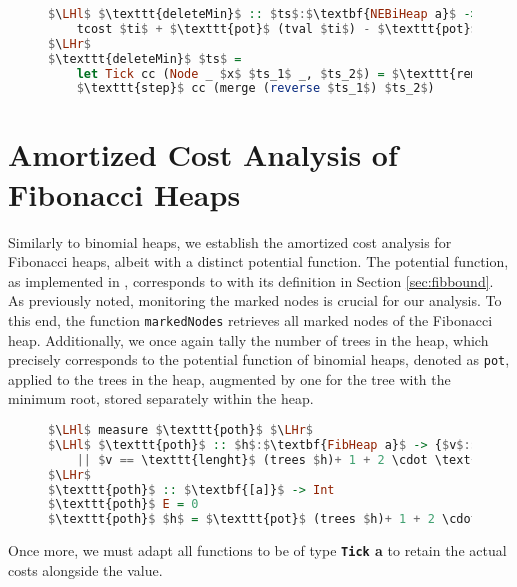 \documentclass{clmthesis}
\begin{document}
\begin{figure}[h]
\begin{lstlisting}[mathescape=true, language=haskell, caption={Amortized cost analysis of \texttt{deleteMin}.},captionpos=b, label=fig:deleteMinPot]
$\LHl$ $\texttt{deleteMin}$ :: $ts$:$\textbf{NEBiHeap a}$ -> {$ti$:$\textbf{Tick (BiHeap a)}$ |
	tcost $ti$ + $\texttt{pot}$ (tval $ti$) - $\texttt{pot}$ $ts$ $\leq$ $2 \cdot (\texttt{pot}$ $ts_1$ + $\texttt{pot}$ $ts_2$)} 
$\LHr$
$\texttt{deleteMin}$ $ts$ =
	let Tick cc (Node _ $x$ $ts_1$ _, $ts_2$) = $\texttt{removeMinTree}$ $ts$ in
	$\texttt{step}$ cc (merge (reverse $ts_1$) $ts_2$) 
\end{lstlisting}
\end{figure}

\FloatBarrier
\section{Amortized Cost Analysis of Fibonacci Heaps}\label{sec:amortizedfib}
Similarly to binomial heaps, we establish the amortized cost analysis for Fibonacci heaps, albeit with a distinct potential function. The potential function, as implemented in , corresponds to with its definition in Section \ref{sec:fibbound}. As previously noted, monitoring the marked nodes is crucial for our analysis. To this end, the function \texttt{markedNodes} retrieves all marked nodes of the Fibonacci heap. Additionally, we once again tally the number of trees in the heap, which precisely corresponds to the potential function of binomial heaps, denoted as \texttt{pot}, applied to the trees in the heap, augmented by one for the tree with the minimum root, stored separately within the heap.

\begin{figure}[h]
\begin{lstlisting}[mathescape=true, language=haskell, caption={Potential function Fibonacci heap.},captionpos=b, label=fig:poth]
$\LHl$ measure $\texttt{poth}$ $\LHr$
$\LHl$ $\texttt{poth}$ :: $h$:$\textbf{FibHeap a}$ -> {$v$:$\textbf{Nat}$ | $v == 0$ &&  $\texttt{emptyFibHeap}$ $h$ 
	|| $v == \texttt{lenght}$ (trees $h)+ 1 + 2 \cdot \text{markedNodes}$ $h$} 
$\LHr$
$\texttt{poth}$ :: $\textbf{[a]}$ -> Int
$\texttt{poth}$ E = 0
$\texttt{poth}$ $h$ = $\texttt{pot}$ (trees $h)+ 1 + 2 \cdot \text{markedNodes}$ $h$
\end{lstlisting}
\end{figure}

Once more, we must adapt all functions to be of type \textbf{\lstinline{Tick} a} to retain the actual costs alongside the value.
\end{document}
